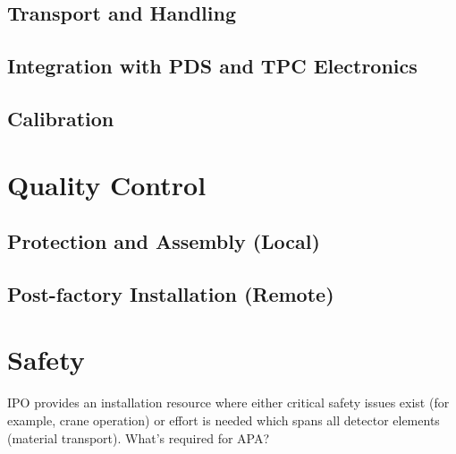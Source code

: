 \subsection{Transport and Handling}
\label{sec:fdsp-apa-install-transport}


\subsection{Integration with PDS and TPC Electronics}
\label{sec:fdsp-apa-install-pds-elec}


\subsection{Calibration}
\label{sec:fdsp-apa-install-calib}




\section{Quality Control}
\label{sec:fdsp-apa-qc}

\subsection{Protection and Assembly (Local)}
\label{sec:fdsp-apa-qc-local}


\subsection{Post-factory Installation (Remote)}
\label{sec:fdsp-apa-qc-remote}



\section{Safety}
\label{sec:fdsp-apa-safety}


IPO provides an installation resource where either critical safety issues exist (for example,  crane	
operation) or effort is needed which spans all	detector elements (material transport). What's required for APA?

